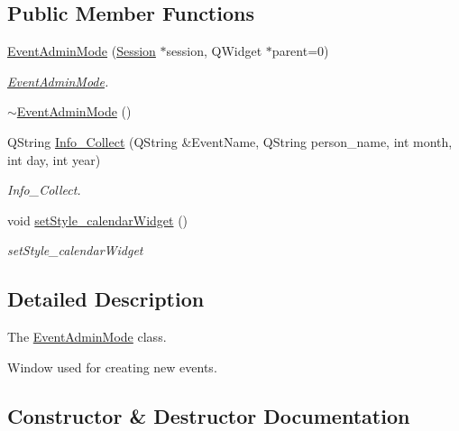 \subsection*{Public Member Functions}
\begin{DoxyCompactItemize}
\item 
\hyperlink{class_event_admin_mode_a6f7d4e143b04287d436e9be16324626d}{Event\+Admin\+Mode} (\hyperlink{class_session}{Session} $\ast$session, Q\+Widget $\ast$parent=0)
\begin{DoxyCompactList}\small\item\em \hyperlink{class_event_admin_mode}{Event\+Admin\+Mode}. \end{DoxyCompactList}\item 
\hyperlink{class_event_admin_mode_a8b5cc3b5ad2067b0f97d7764d2520ca9}{$\sim$\+Event\+Admin\+Mode} ()
\item 
Q\+String \hyperlink{class_event_admin_mode_a22d5e21b4a4450e1917085c2375239c9}{Info\+\_\+\+Collect} (Q\+String \&Event\+Name, Q\+String person\+\_\+name, int month, int day, int year)
\begin{DoxyCompactList}\small\item\em Info\+\_\+\+Collect. \end{DoxyCompactList}\item 
void \hyperlink{class_event_admin_mode_a8e7abbf82a05352cacc29d544a682139}{set\+Style\+\_\+calendar\+Widget} ()
\begin{DoxyCompactList}\small\item\em set\+Style\+\_\+calendar\+Widget \end{DoxyCompactList}\end{DoxyCompactItemize}


\subsection{Detailed Description}
The \hyperlink{class_event_admin_mode}{Event\+Admin\+Mode} class. 

Window used for creating new events. 

\subsection{Constructor \& Destructor Documentation}
\mbox{\label{class_event_admin_mode_a6f7d4e143b04287d436e9be16324626d}} 
